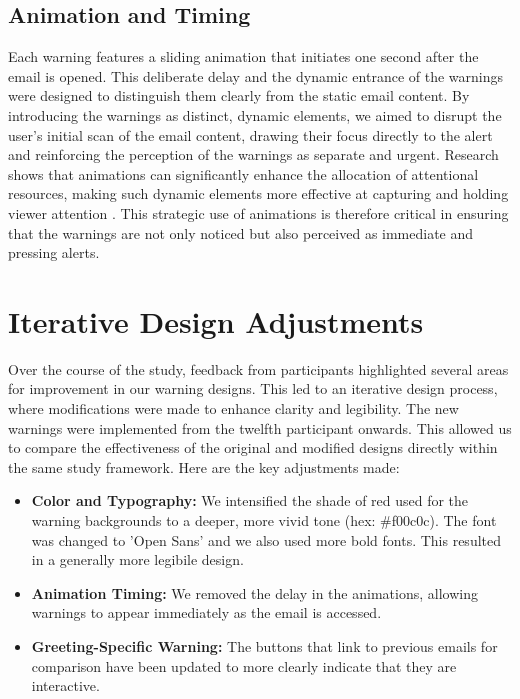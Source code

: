 \documentclass[
  a4paper,  %
  twoside,  %
  bibliography=totoc,
  headsepline,
  cleardoublepage=empty,
  parskip=half,
  draft=false
]{scrbook}
\begin{document}
\subsection{Animation and Timing}
Each warning features a sliding animation that initiates one second after the email is opened. This deliberate delay and the dynamic entrance of the warnings were designed to distinguish them clearly from the static email content. By introducing the warnings as distinct, dynamic elements, we aimed to disrupt the user's initial scan of the email content, drawing their focus directly to the alert and reinforcing the perception of the warnings as separate and urgent. Research shows that animations can significantly enhance the allocation of attentional resources, making such dynamic elements more effective at capturing and holding viewer attention \cite{muller}. This strategic use of animations is therefore critical in ensuring that the warnings are not only noticed but also perceived as immediate and pressing alerts.

\section{Iterative Design Adjustments}
\label{adjust}
Over the course of the study, feedback from participants highlighted several areas for improvement in our warning designs. This led to an iterative design process, where modifications were made to enhance clarity and legibility. The new warnings were implemented from the twelfth participant onwards. This allowed us to compare the effectiveness of the original and modified designs directly within the same study framework. Here are the key adjustments made:

\begin{itemize}
    \item \textbf{Color and Typography:} We intensified the shade of red used for the warning backgrounds to a deeper, more vivid tone (hex: \#f00c0c). The font was changed to 'Open Sans' and we also used more bold fonts. This resulted in a generally more legibile design.
    \item \textbf{Animation Timing:} We removed the delay in the animations, allowing warnings to appear immediately as the email is accessed.
    \item \textbf{Greeting-Specific Warning:} 
    The buttons that link to previous emails for comparison have been updated to more clearly indicate that they are interactive.
\end{itemize}
\end{document}
